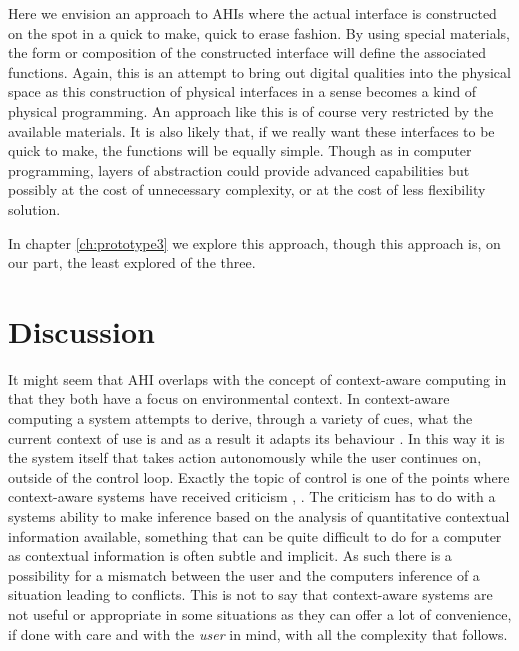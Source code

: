 Here we envision an approach to AHIs where the actual interface is constructed on the spot in a quick to make, quick to erase fashion.
By using special materials, the form or composition of the constructed interface will define the associated functions.
Again, this is an attempt to bring out digital qualities into the physical space as this construction of physical interfaces in a sense becomes a kind of physical programming.
An approach like this is of course very restricted by the available materials.
It is also likely that, if we really want these interfaces to be quick to make, the functions will be equally simple.
Though as in computer programming, layers of abstraction could provide advanced capabilities but possibly at the cost of unnecessary complexity, or at the cost of less flexibility solution.

In chapter \ref{ch:prototype3} we explore this approach, though this approach is, on our part, the least explored of the three.

\section{Discussion} 

It might seem that AHI overlaps with the concept of context-aware computing in that they both have a focus on environmental context.
In context-aware computing a system attempts to derive, through a variety of cues, what the current context of use is and as a result it adapts its behaviour \citep[chap. 8]{krumm2009ubiquitous}. 
In this way it is the system itself that takes action autonomously while the user continues on, outside of the control loop.
Exactly the topic of control is one of the points where context-aware systems have received criticism \cite{erickson2002some}, \citep[chap. 8]{krumm2009ubiquitous}.
The criticism has to do with a systems ability to make inference based on the analysis of quantitative contextual information available, something that can be quite difficult to do for a computer as contextual information is often subtle and implicit.
As such there is a possibility for a mismatch between the user and the computers inference of a situation leading to conflicts.
This is not to say that context-aware systems are not useful or appropriate in some situations as they can offer a lot of convenience, if done with care and with the \emph{user} in mind, with all the complexity that follows.


